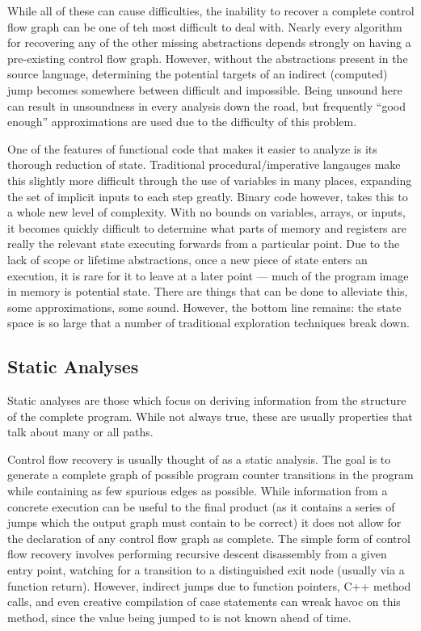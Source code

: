 While all of these can cause difficulties, the inability to recover a complete control flow graph can be one of teh most difficult to deal with.
Nearly every algorithm for recovering any of the other missing abstractions depends strongly on having a pre-existing control flow graph.
However, without the abstractions present in the source language, determining the potential targets of an indirect (computed) jump becomes somewhere between difficult and impossible.
Being unsound here can result in unsoundness in every analysis down the road, but frequently ``good enough'' approximations are used due to the difficulty of this problem.

One of the features of functional code that makes it easier to analyze is its thorough reduction of state.
Traditional procedural/imperative langauges make this slightly more difficult through the use of variables in many places, expanding the set of implicit inputs to each step greatly.
Binary code however, takes this to a whole new level of complexity.
With no bounds on variables, arrays, or inputs, it becomes quickly difficult to determine what parts of memory and registers are really the relevant state executing forwards from a particular point.
Due to the lack of scope or lifetime abstractions, once a new piece of state enters an execution, it is rare for it to leave at a later point --- much of the program image in memory is potential state.
There are things that can be done to alleviate this, some approximations, some sound.
However, the bottom line remains: the state space is so large that a number of traditional exploration techniques break down.

\subsection{Static Analyses}
Static analyses are those which focus on deriving information from the structure of the complete program.
While not always true, these are usually properties that talk about many or all paths.

Control flow recovery is usually thought of as a static analysis.
The goal is to generate a complete graph of possible program counter transitions in the program while containing as few spurious edges as possible.
While information from a concrete execution can be useful to the final product (as it contains a series of jumps which the output graph must contain to be correct) it does not allow for the declaration of any control flow graph as complete.
The simple form of control flow recovery involves performing recursive descent disassembly from a given entry point, watching for a transition to a distinguished exit node (usually via a function return).
However, indirect jumps due to function pointers, C++ method calls, and even creative compilation of case statements can wreak havoc on this method, since the value being jumped to is not known ahead of time.


